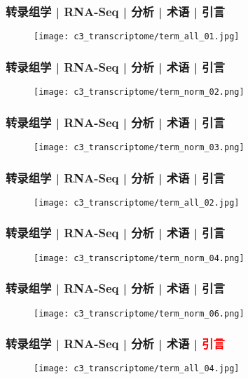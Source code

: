 \begin{frame}
  \frametitle{转录组学 | RNA-Seq | 分析 | 术语 | 引言}
  \begin{figure}
    \centering
    \texttt{[image: c3\_transcriptome/term\_all\_01.jpg]}
  \end{figure}
\end{frame}

\begin{frame}
  \frametitle{转录组学 | RNA-Seq | 分析 | 术语 | 引言}
  \begin{figure}
    \centering
    \texttt{[image: c3\_transcriptome/term\_norm\_02.png]}
  \end{figure}
\end{frame}

\begin{frame}
  \frametitle{转录组学 | RNA-Seq | 分析 | 术语 | 引言}
  \begin{figure}
    \centering
    \texttt{[image: c3\_transcriptome/term\_norm\_03.png]}
  \end{figure}
\end{frame}

\begin{frame}
  \frametitle{转录组学 | RNA-Seq | 分析 | 术语 | 引言}
  \begin{figure}
    \centering
    \texttt{[image: c3\_transcriptome/term\_all\_02.jpg]}
  \end{figure}
\end{frame}

\begin{frame}
  \frametitle{转录组学 | RNA-Seq | 分析 | 术语 | 引言}
  \begin{figure}
    \centering
    \texttt{[image: c3\_transcriptome/term\_norm\_04.png]}
  \end{figure}
\end{frame}

\begin{frame}
  \frametitle{转录组学 | RNA-Seq | 分析 | 术语 | 引言}
  \begin{figure}
    \centering
    \texttt{[image: c3\_transcriptome/term\_norm\_06.png]}
  \end{figure}
\end{frame}

\begin{frame}
  \frametitle{转录组学 | RNA-Seq | 分析 | 术语 | \textcolor{red}{引言}}
  \begin{figure}
    \centering
    \texttt{[image: c3\_transcriptome/term\_all\_04.jpg]}
  \end{figure}
\end{frame}

